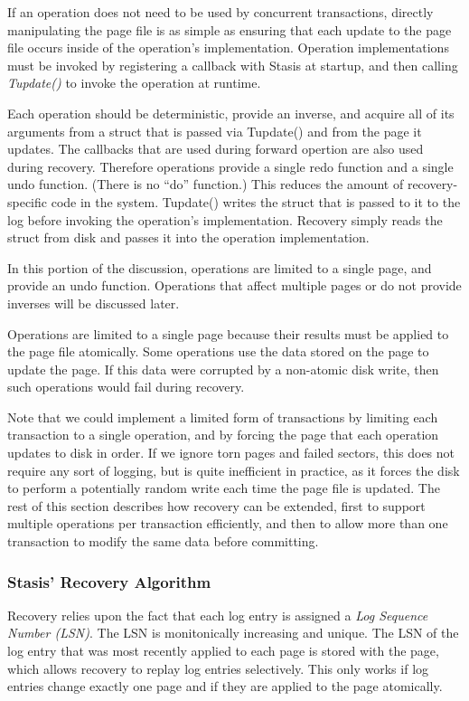 \documentclass[letterpaper,twocolumn,10pt]{article}
\newcommand{\yad}{Stasis\xspace}
\newcommand{\yads}{Stasis'\xspace}
\begin{document}
If an operation does not need to be used by concurrent
transactions, directly manipulating the page file is as simple as
ensuring that each update to the page file occurs inside of the
operation's implementation.  Operation implementations must be invoked
by registering a callback with \yad at startup, and then calling {\em
Tupdate()} to invoke the operation at runtime.  

Each operation should be deterministic, provide an inverse, and
acquire all of its arguments from a struct that is passed via
Tupdate() and from the page it updates.  The callbacks that are used
during forward opertion are also used during recovery.  Therefore
operations provide a single redo function and a single undo function.
(There is no ``do'' function.)  This reduces the amount of
recovery-specific code in the system.  Tupdate() writes the struct
that is passed to it to the log before invoking the operation's
implementation.  Recovery simply reads the struct from disk and passes
it into the operation implementation.

In this portion of the discussion, operations are limited
to a single page, and provide an undo function.  Operations that
affect multiple pages or do not provide inverses will be
discussed later.

Operations are limited to a single page because their results must be
applied to the page file atomically.  Some operations use the data
stored on the page to update the page.  If this data were corrupted by
a non-atomic disk write, then such operations would fail during recovery.

Note that we could implement a limited form of transactions by
limiting each transaction to a single operation, and by forcing the
page that each operation updates to disk in order.  If we ignore torn 
pages and failed sectors, this does not
require any sort of logging, but is quite inefficient in practice, as
it forces the disk to perform a potentially random write each time the
page file is updated.  The rest of this section describes how recovery
can be extended, first to support multiple operations per
transaction efficiently, and then to allow more than one transaction to modify the
same data before committing.

\subsubsection{\yads Recovery Algorithm}

Recovery relies upon the fact that each log entry is assigned a {\em
Log Sequence Number (LSN)}.  The LSN is monitonically increasing and
unique.  The LSN of the log entry that was most recently applied to
each page is stored with the page, which allows recovery to replay log entries selectively.  This only works if log entries change exactly one
page and if they are applied to the page atomically.
\end{document}
